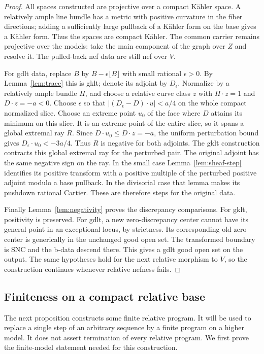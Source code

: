 \begin{proof}
All spaces constructed are projective over a compact K\"ahler space.
A relatively ample line bundle has a metric with positive curvature
in the fiber directions; adding a sufficiently large pullback of a
K\"ahler form on the base gives a K\"ahler form.  Thus the spaces are
compact K\"ahler.  The common carrier remains projective over the
models: take the main component of the graph over $Z$ and resolve it.
The pulled-back nef data are still nef over $V$.

For gdlt data, replace $B$ by
$B-\epsilon\lfloor B\rfloor$ with small rational $\epsilon>0$.
By Lemma~\ref{lem:trace} this is gklt; denote its adjoint by $D_\epsilon$.
Normalize by a relatively ample bundle $H$, and choose a relative
curve class $z$ with $H\cdot z=1$ and $D\cdot z=-a<0$.
Choose $\epsilon$ so that
$|(D_\epsilon-D)\cdot u|<a/4$ on the whole compact normalized slice.
Choose an extreme point $u_0$ of the face where $D$ attains its
minimum on this slice.  It is an extreme point of the entire slice,
so it spans a global extremal ray $R$.  Since
$D\cdot u_0\leq D\cdot z=-a$, the uniform perturbation bound gives
$D_\epsilon\cdot u_0<-3a/4$.  Thus $R$ is negative for both
adjoints.  The gklt construction contracts this global extremal ray
for the perturbed pair.
The original adjoint has the same negative sign on the ray.  In the
small case Lemma~\ref{lem:sheaf-step} identifies its positive transform
with a positive multiple of the perturbed positive adjoint modulo a
base pullback.  In the divisorial case that lemma makes its pushdown
rational Cartier.  These are therefore steps for the original data.

Finally Lemma~\ref{lem:negativity} proves the discrepancy comparisons.
For gklt, positivity is preserved.  For gdlt, a new zero-discrepancy
center cannot have its general point in an exceptional locus, by
strictness.  Its corresponding old zero center is generically in the
unchanged good open set.  The transformed boundary is SNC and the
b-data descend there.  This gives a gdlt good open set on the output.
The same hypotheses hold for the next relative morphism to $V$, so
the construction continues whenever relative nefness fails.
\end{proof}

\subsection{Finiteness on a compact relative base}

The next proposition constructs some finite relative program.  It will
be used to replace a single step of an arbitrary sequence by a finite
program on a higher model.  It does not assert termination of every
relative program.  We first prove the finite-model statement needed
for this construction.

